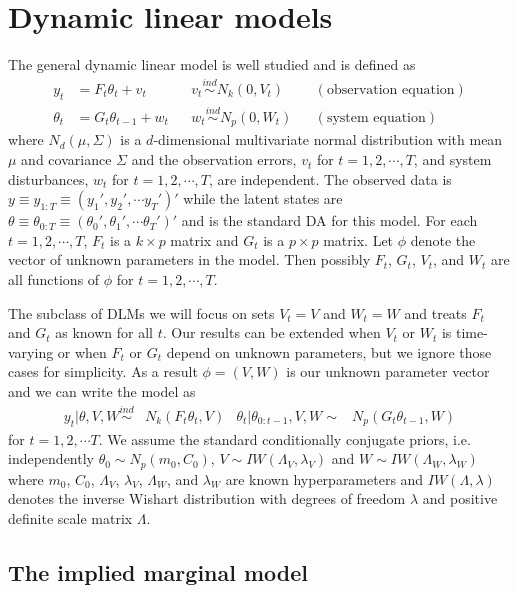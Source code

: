 \documentclass[12pt]{article}
\begin{document}
\section{Dynamic linear models} \label{sec:DLM}

The general dynamic linear model is well studied \citep{harrison1999bayesian,petris2009dynamic,prado2010time} and is defined as
\begin{align*}
y_t &= F_t\theta_t + v_t && v_t \stackrel{ind}{\sim} N_k(0,V_t) && (\mbox{observation equation}) \\
 \theta_t &= G_t\theta_{t-1} + w_t && w_t \stackrel{ind}{\sim} N_p(0,W_t) && (\mbox{system equation}) 
\end{align*}
where $N_d(\mu,\Sigma)$ is a $d$-dimensional multivariate normal distribution with mean $\mu$ and covariance $\Sigma$ and the observation errors, $v_{t}$ for $t=1,2,\cdots,T$, and system disturbances, $w_{t}$ for $t=1,2,\cdots,T$, are independent. The observed data is $y\equiv y_{1:T} \equiv (y_1',y_2',\cdots y_T')'$ while the latent states are $\theta \equiv \theta_{0:T} \equiv (\theta_0',\theta_1',\cdots \theta_T')'$ and is the standard DA for this model. For each $t=1,2,\cdots,T$, $F_t$ is a $k\times p$ matrix and $G_t$ is a $p\times p$ matrix. Let $\phi$ denote the vector of unknown parameters in the model. Then possibly $F_{t}$, $G_{t}$, $V_{t}$, and $W_{t}$ are all functions of $\phi$ for $t=1,2,\cdots,T$.

The subclass of DLMs we will focus on sets $V_t=V$ and $W_t=W$ and treats $F_{t}$ and $G_{t}$ as known for all $t$. Our results can be extended when $V_t$ or $W_t$ is time-varying or when $F_t$ or $G_t$ depend on unknown parameters, but we ignore those cases for simplicity. As a result $\phi=(V,W)$ is our unknown parameter vector and we can write the model as
\begin{align}
  y_t|\theta,V,W \stackrel{ind}{\sim} & N_k(F_t\theta_t,V) &
  \theta_t|\theta_{0:t-1},V,W  \sim & N_p(G_t\theta_{t-1},W) \label{dlmbotheqs}
\end{align}
for $t=1,2,\cdots T$. We assume the standard conditionally conjugate priors, i.e. independently $\theta_0 \sim N_p(m_0, C_0)$, $V \sim IW(\Lambda_V, \lambda_V)$ and $W \sim IW(\Lambda_W, \lambda_W)$ where $m_0$, $C_0$, $\Lambda_V$, $\lambda_V$, $\Lambda_W$, and $\lambda_W$ are known hyperparameters and $IW(\Lambda, \lambda)$ denotes the inverse Wishart distribution with degrees of freedom $\lambda$ and positive definite scale matrix $\Lambda$.

\subsection{The implied marginal model}\label{sec:DLM:marg}
\end{document}
